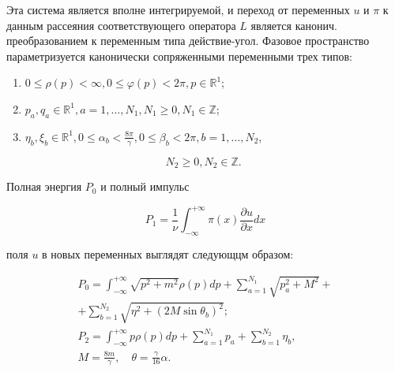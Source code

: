 \documentclass[10pt]{article}
\begin{document}
Эта система является вполне интегрируемой, и переход от переменных $u$ и $\pi$ к данным рассеяния соответствующего оператора $L$ является канонич. преобразованием к переменным типа действие-угол. Фазовое пространство параметризуется канонически сопряженными переменными трех типов:



\begin{enumerate}

  \item $0 \leqslant \rho(p)<\infty, 0 \leqslant \varphi(p)<2 \pi, p \in \mathbb{R}^{1}$;



  \item $p_{a}, q_{a} \in \mathbb{R}^{1}, a=1, \ldots, N_{1}, N_{1} \geqslant 0, N_{1} \in \mathbb{Z}$;



  \item $\eta_{b}, \xi_{b} \in \mathbb{R}^{1}, 0 \leqslant \alpha_{b}<\frac{8 \pi}{\gamma}, 0 \leqslant \beta_{b}<2 \pi, b=1, \ldots, N_{2}$,



\end{enumerate}



\[

N_{2} \geqslant 0, N_{2} \in \mathbb{Z} \text {. }

\]



Полная энергия $P_{0}$ и полный импульс



\[

P_{1}=\frac{1}{\nu} \int_{-\infty}^{+\infty} \pi(x) \frac{\partial u}{\partial x} d x

\]



поля $u$ в новых переменных выглядят следующцм образом:



\[

\begin{gathered}

P_{0}=\int_{-\infty}^{+\infty} \sqrt{p^{2}+m^{2}} \rho(p) d p+\sum_{a=1}^{N_{1}} \sqrt{p_{a}^{2}+M^{2}}+ \\

+\sum_{b=1}^{N_{2}} \sqrt{\eta^{2}+\left(2 M \sin \theta_{b}\right)^{2}} ; \\

P_{2}=\int_{-\infty}^{+\infty} p \rho(p) d p+\sum_{a=1}^{N_{1}} p_{a}+\sum_{b=1}^{N_{2}} \eta_{b}, \\

M=\frac{8 m}{\gamma}, \quad \theta=\frac{\gamma}{16} \alpha .

\end{gathered}

\]
\end{document}
